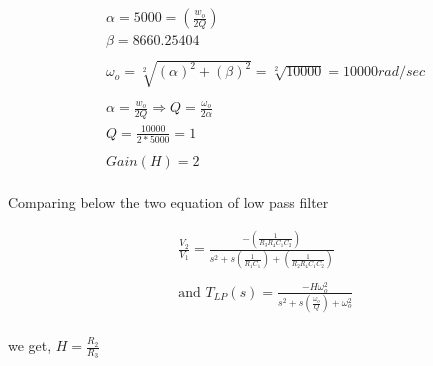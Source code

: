 \documentclass[a4paper,11pt]{article}
\newcommand\ddfrac[2]{\frac{\displaystyle #1}{\displaystyle #2}}
\begin{document}
\begin{equation*}
    \begin{aligned}
         & \alpha = 5000 = (\frac{w_o}{2Q})                                           \\
         & \beta = 8660.25404                                                         \\\\
         & \omega_o = \sqrt[2]{(\alpha)^2+(\beta)^2} = \sqrt[2]{10000} = 10000rad/sec \\\\
         & \alpha = \frac{w_o}{2Q}\Rightarrow Q = \frac{\omega_o}{2\alpha}            \\
         & Q = \frac{10000}{2*5000} = 1                                               \\\\
         & Gain(H) = 2                                                                \\
    \end{aligned}
\end{equation*}

Comparing below the two equation of low pass filter


\begin{equation*}
    \begin{aligned}
         & \frac{V_2}{V_1}=\ddfrac{-\left(\frac{1}{R_3R_4C_1C_2}\right)}{s^2+s\left(\frac{1}{R_1C_1}\right)+\left(\frac{1}{R_2R_4C_1C_2}\right)} \\\\
         & \text{and } T_{LP}(s)=\ddfrac{-H\omega_o^2}{s^2+s\left(\frac{\omega_o}{Q}\right)+\omega_o^2}                                          \\
    \end{aligned}
\end{equation*}

we get,   $ H = \ddfrac{R_2}{R_3}$
\end{document}
